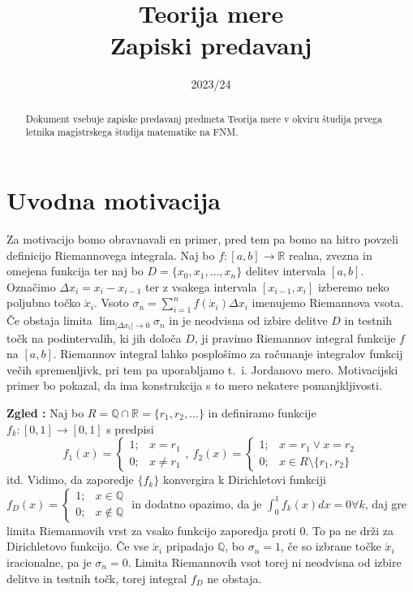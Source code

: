 \documentclass[a4paper, 10pt]{article}
\title{Teorija mere\\ Zapiski predavanj}
\date{2023/24}
\newcounter{zgledcount}
\newenvironment{zgled}{\begin{flushleft}\stepcounter{zgledcount}\textbf{Zgled \arabic{zgledcount}:}}{\hfill\end{flushleft}}
\newcommand{\abs}[1]{\ensuremath{\lvert #1 \rvert}}
\newcommand{\mth}[1]{\ensuremath{\mathbb{#1}}}
\newcommand{\R}{\mth{R}}
\newcommand{\map}[3]{\ensuremath{{#1}: {#2} \rightarrow {#3}}}
\begin{document}
	\maketitle
	\newpage
	\begin{abstract}
		\noindent Dokument vsebuje zapiske predavanj predmeta Teorija mere v okviru študija prvega letnika magistrskega študija matematike na FNM.
	\end{abstract}
	\newpage
	\tableofcontents
	\newpage
	\section{Uvodna motivacija}
	Za motivacijo bomo obravnavali en primer, pred tem pa bomo na hitro povzeli definicijo Riemannovega integrala. Naj bo \map{f}{[a, b]}{\R} realna, zvezna in omejena funkcija ter naj bo $D=\{x_0, x_1, \ldots, x_n\}$ delitev intervala $[a, b]$. Označimo $\Delta x_i = x_i - x_{i-1}$ ter z vsakega intervala $[x_{i-1}, x_i]$ izberemo neko poljubno točko $\acute{x}_i$. Vsoto $\sigma_n = \sum_{i = 1}^{n}f(\acute{x}_i)\Delta x_i$ imenujemo Riemannova vsota. Če obstaja limita $\lim_{\abs{\Delta x_i}\to 0}\sigma_n$ in je neodvisna od izbire delitve $D$ in testnih točk na podintervalih, ki jih določa $D$, ji pravimo Riemannov integral funkcije $f$ na $[a, b]$. Riemannov integral lahko posplošimo za računanje integralov funkcij večih spremenljivk, pri tem pa uporabljamo t.~i. Jordanovo mero. Motivacijski primer bo pokazal, da ima konstrukcija s to mero nekatere pomanjkljivosti.
	
	\begin{zgled}
		Naj bo $R = \mth{Q}\cap \R = \{r_1, r_2, \ldots\}$ in definiramo funkcije \map{f_k}{[0, 1]}{[0, 1]} s predpisi \[f_1(x) = \begin{cases}
			1;& x = r_1 \\
			0;& x\neq r_1
		\end{cases}, ~f_2(x) = \begin{cases}
		1;& x = r_1 \lor x = r_2 \\
		0;& x\in R\setminus\{r_1, r_2\}
		\end{cases}\] itd. Vidimo, da zaporedje $\{f_k\}$ konvergira k Dirichletovi funkciji $f_D(x) = \begin{cases}
		1;& x\in \mth{Q} \\
		0;& x\notin \mth{Q}
	\end{cases}$ in dodatno opazimo, da je $\int_{0}^{1}f_k(x)dx = 0 \forall k$, daj gre limita Riemannovih vrst za vsako funkcijo zaporedja proti $0$. To pa ne drži za Dirichletovo funkcijo. Če vse $\acute{x}_i$ pripadajo $\mth{Q}$, bo $\sigma_n = 1$, če so izbrane točke $\acute{x}_i$ iracionalne, pa je $\sigma_n = 0$. Limita Riemannovih vsot torej ni neodvisna od izbire delitve in testnih točk, torej integral $f_D$ ne obstaja.
	\end{zgled}
	
\end{document}
